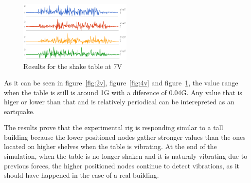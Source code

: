\begin{figure}[ht] \centering
  \includegraphics[width=0.5\textwidth]{img/7v.png}
  \caption{Results for the shake table at 7V}
  \label{fig:7v}
\end{figure}

As it can be seen in figure~\ref{fig:2v}, figure~\ref{fig:4v} and figure~\ref{fig:7v}, the value range when the table is still is around 1G with a diference of 0.04G. Any value that is higer or lower than that and is relatively periodical can be interepreted as an eartquake. 

The results prove that the experimental rig is responding similar to a tall building because the lower positioned nodes gather stronger values than the ones located on higher shelves 
when the table is vibrating. At the end of the simulation, when the table is no longer shaken and it is naturaly vibrating due to previous forces, the higher positioned nodes continue 
to detect vibrations, as it should have happened in the case of a real building.
